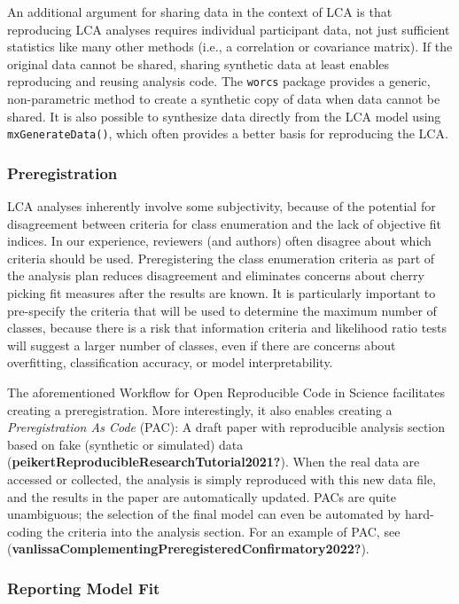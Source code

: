 \documentclass[
  ,man,floatsintext]{apa6}
\begin{document}
An additional argument for sharing data in the context of LCA is that
reproducing LCA analyses requires individual participant data, not just
sufficient statistics like many other methods (i.e., a correlation or
covariance matrix). If the original data cannot be shared, sharing
synthetic data at least enables reproducing and reusing analysis code.
The \texttt{worcs} package provides a generic, non-parametric method to create
a synthetic copy of data when data cannot be shared. It is also possible
to synthesize data directly from the LCA model using \texttt{mxGenerateData()},
which often provides a better basis for reproducing the LCA.

\hypertarget{preregistration}{%
\subsubsection{Preregistration}\label{preregistration}}

LCA analyses inherently involve some subjectivity, because of the
potential for disagreement between criteria for class enumeration and
the lack of objective fit indices. In our experience, reviewers (and
authors) often disagree about which criteria should be used.
Preregistering the class enumeration criteria as part of the analysis
plan reduces disagreement and eliminates concerns about cherry picking
fit measures after the results are known. It is particularly important
to pre-specify the criteria that will be used to determine the maximum
number of classes, because there is a risk that information criteria and
likelihood ratio tests will suggest a larger number of classes, even if
there are concerns about overfitting, classification accuracy, or model
interpretability.

The aforementioned Workflow for Open Reproducible Code in Science
facilitates creating a preregistration. More interestingly, it also
enables creating a \emph{Preregistration As Code} (PAC): A draft paper with
reproducible analysis section based on fake (synthetic or simulated)
data (\textbf{peikertReproducibleResearchTutorial2021?}). When the real data are
accessed or collected, the analysis is simply reproduced with this new
data file, and the results in the paper are automatically updated. PACs
are quite unambiguous; the selection of the final model can even be
automated by hard-coding the criteria into the analysis section. For an
example of PAC, see (\textbf{vanlissaComplementingPreregisteredConfirmatory2022?}).

\hypertarget{reporting-model-fit}{%
\subsubsection{Reporting Model Fit}\label{reporting-model-fit}}
\end{document}
